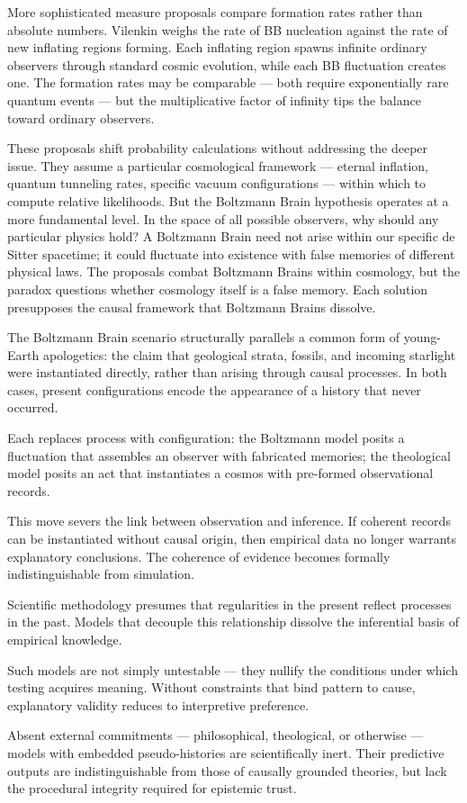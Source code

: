 More sophisticated measure proposals compare formation rates rather than absolute numbers. Vilenkin weighs the rate of BB nucleation against the rate of new inflating regions forming. Each inflating region spawns infinite ordinary observers through standard cosmic evolution, while each BB fluctuation creates one. The formation rates may be comparable — both require exponentially rare quantum events — but the multiplicative factor of infinity tips the balance toward ordinary observers.

These proposals shift probability calculations without addressing the deeper issue. They assume a particular cosmological framework — eternal inflation, quantum tunneling rates, specific vacuum configurations — within which to compute relative likelihoods. But the Boltzmann Brain hypothesis operates at a more fundamental level. In the space of all possible observers, why should any particular physics hold? A Boltzmann Brain need not arise within our specific de Sitter spacetime; it could fluctuate into existence with false memories of different physical laws. The proposals combat Boltzmann Brains within cosmology, but the paradox questions whether cosmology itself is a false memory. Each solution presupposes the causal framework that Boltzmann Brains dissolve.

\begin{commentary}
The Boltzmann Brain scenario structurally parallels a common form of young-Earth apologetics: the claim that geological strata, fossils, and incoming starlight were instantiated directly, rather than arising through causal processes. In both cases, present configurations encode the appearance of a history that never occurred.

Each replaces process with configuration: the Boltzmann model posits a fluctuation that assembles an observer with fabricated memories; the theological model posits an act that instantiates a cosmos with pre-formed observational records.

This move severs the link between observation and inference. If coherent records can be instantiated without causal origin, then empirical data no longer warrants explanatory conclusions. The coherence of evidence becomes formally indistinguishable from simulation.

Scientific methodology presumes that regularities in the present reflect processes in the past. Models that decouple this relationship dissolve the inferential basis of empirical knowledge.

Such models are not simply untestable — they nullify the conditions under which testing acquires meaning. Without constraints that bind pattern to cause, explanatory validity reduces to interpretive preference.

Absent external commitments — philosophical, theological, or otherwise — models with embedded pseudo-histories are scientifically inert. Their predictive outputs are indistinguishable from those of causally grounded theories, but lack the procedural integrity required for epistemic trust.
\end{commentary}

